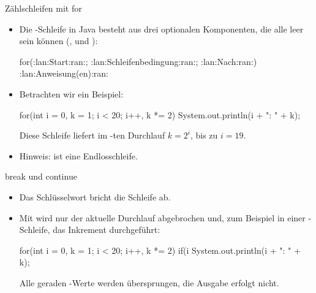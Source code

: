 \begin{frame}[fragile]{Zählschleifen mit for}
    \begin{itemize}[<+(1)->]
        \widei
        \item Die -Schleife in Java besteht aus drei optionalen Komponenten,\pause{} die alle leer sein können (,   und ):
        \begin{plainjava}
for(:lan:Start:ran:; :lan:Schleifenbedingung:ran:; :lan:Nach:ran:) {
    :lan:Anweisung(en):ran:
}
        \end{plainjava}
        \item Betrachten wir ein Beispiel:\pause{}
\begin{plainjava}
for(int i = 0, k = 1; i < 20; i++, k *= 2)
    System.out.println(i + ": " + k);
\end{plainjava}
    \pause{}Diese Schleife liefert im -ten Durchlauf \(k = 2^i\),\pause{} bis zu \(i = 19\).
        \item Hinweis:  ist eine Endlosschleife.
    \end{itemize}
\end{frame}

\begin{frame}[fragile]{break und continue}
    \begin{itemize}[<+(1)->]
        \widei
        \item Das Schlüsselwort  bricht die  Schleife ab.
        \item Mit  wird nur der aktuelle Durchlauf abgebrochen und,\pause{} zum Beispiel in einer -Schleife,\pause{} das Inkrement durchgeführt:\pause{}
\begin{plainjava}
for(int i = 0, k = 1; i < 20; i++, k *= 2) {
    if(i %
    System.out.println(i + ": " + k);
}
\end{plainjava}
        \pause{}Alle geraden -Werte werden übersprungen, die Ausgabe erfolgt nicht.
    \end{itemize}
\end{frame}

